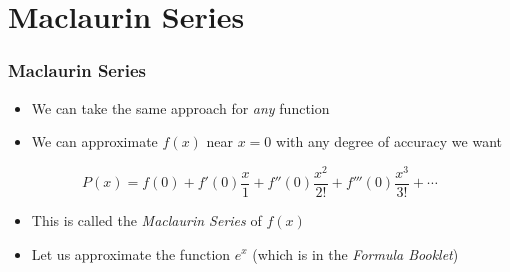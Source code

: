 \documentclass{beamer}
\begin{document}
\section{Maclaurin Series}

\begin{frame}
  \frametitle{Maclaurin Series}
  \begin{itemize}
    \item We can take the same approach for \textit{any} function
    \item We can approximate \( f(x) \) near \( x = 0 \) with any degree of accuracy we want
  \end{itemize}
  \begin{equation*}
    P(x) = f(0) + f'(0)\frac{x}{1} + f''(0)\frac{x^2}{2!} + f'''(0)\frac{x^3}{3!} + \cdots
  \end{equation*}
  \begin{itemize}
    \item This is called the \textit{Maclaurin Series} of \( f(x) \)
    \item Let us approximate the function \( e^x \) (which is in the \textit{Formula Booklet})
  \end{itemize}
\end{frame}

\end{document}
